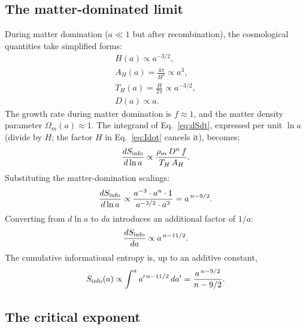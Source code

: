 \subsection{The matter-dominated limit}
During matter domination ($a\ll1$ but after recombination), the cosmological quantities take simplified forms:
\begin{gather}
H(a)\propto a^{-3/2},\label{eq:th:Hmd}\\
A_H(a)=\frac{4\pi}{H^2}\propto a^{3},\\
T_H(a)=\frac{H}{2\pi}\propto a^{-3/2},\\
D(a)\propto a.\label{eq:th:Dmd}
\end{gather}
The growth rate during matter domination is $f\approx1$, and the matter density parameter $\Omega_m(a)\approx1$. The integrand of Eq.~\eqref{eq:dSdt},
expressed per unit $\ln a$ (divide by $H$; the factor $H$ in Eq.~\eqref{eq:Idot} cancels it), becomes:
\begin{equation}\frac{dS_{\rm info}}{d\ln a}\propto\frac{\rho_m\,D^n\,f}{T_H\,A_H}.\label{eq:th:perlna}\end{equation}
Substituting the matter-domination scalings:
\begin{equation}\frac{dS_{\rm info}}{d\ln a}\propto\frac{a^{-3}\cdot a^n\cdot1}{a^{-3/2}\cdot a^{3}}=a^{\,n-9/2}.\label{eq:th:power}\end{equation}
Converting from $d\ln a$ to $da$ introduces an additional factor of $1/a$:
\begin{equation}\frac{dS_{\rm info}}{da}\propto a^{\,n-11/2}.\label{eq:th:perda}\end{equation}
The cumulative informational entropy is, up to an additive constant,
\begin{equation}S_{\rm info}(a)\propto\int^{a}a'^{\,n-11/2}\,da'=\frac{a^{\,n-9/2}}{n-9/2}.\label{eq:Sn}\end{equation}
\derived

\subsection{The critical exponent}\label{sec:th:exponent}

